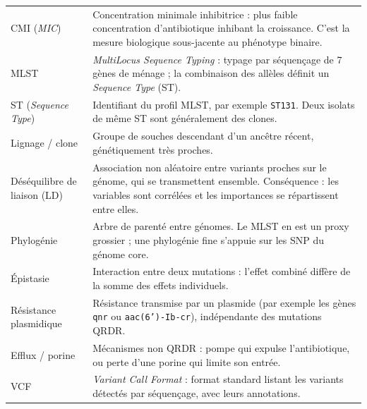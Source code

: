 \documentclass[11pt,a4paper]{article}
\begin{document}
\begin{longtable}{@{}>{\raggedright\arraybackslash}p{3.5cm}>{\raggedright\arraybackslash}p{12cm}@{}}
CMI (\emph{MIC}) & Concentration minimale inhibitrice : plus faible concentration d'antibiotique inhibant la croissance. C'est la mesure biologique sous-jacente au phénotype binaire. \\
MLST & \emph{MultiLocus Sequence Typing} : typage par séquençage de 7 gènes de ménage ; la combinaison des allèles définit un \emph{Sequence Type} (ST). \\
ST (\emph{Sequence Type}) & Identifiant du profil MLST, par exemple \texttt{ST131}. Deux isolats de même ST sont généralement des clones. \\
Lignage / clone & Groupe de souches descendant d'un ancêtre récent, génétiquement très proches. \\
Déséquilibre de liaison (LD) & Association non aléatoire entre variants proches sur le génome, qui se transmettent ensemble. Conséquence : les variables sont corrélées et les importances se répartissent entre elles. \\
Phylogénie & Arbre de parenté entre génomes. Le MLST en est un proxy grossier ; une phylogénie fine s'appuie sur les SNP du génome core. \\
Épistasie & Interaction entre deux mutations : l'effet combiné diffère de la somme des effets individuels. \\
Résistance plasmidique & Résistance transmise par un plasmide (par exemple les gènes \texttt{qnr} ou \texttt{aac(6')-Ib-cr}), indépendante des mutations QRDR. \\
Efflux / porine & Mécanismes non QRDR : pompe qui expulse l'antibiotique, ou perte d'une porine qui limite son entrée. \\
VCF & \emph{Variant Call Format} : format standard listant les variants détectés par séquençage, avec leurs annotations. \\
\end{longtable}
\end{document}
